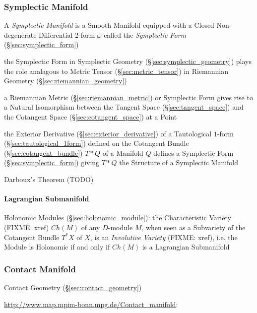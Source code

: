 \subsubsection{Symplectic Manifold}\label{sec:symplectic_manifold}

A \emph{Symplectic Manifold} is a Smooth Manifold equipped with a Closed
Non-degenerate Differential 2-form $\omega$ called the \emph{Symplectic Form}
(\S\ref{sec:symplectic_form})

the Symplectic Form in Symplectic Geometry (\S\ref{sec:symplectic_geometry})
plays the role analagous to Metric Tensor (\S\ref{sec:metric_tensor}) in
Riemannian Geometry (\S\ref{sec:riemannian_geometry})

a Riemannian Metric (\S\ref{sec:riemannian_metric}) or Symplectic Form gives
rise to a Natural Isomorphism between the Tangent Space
(\S\ref{sec:tangent_space}) and the Cotangent Space
(\S\ref{sec:cotangent_space}) at a Point

the Exterior Derivative (\S\ref{sec:exterior_derivative}) of a Tautological
$1$-form (\S\ref{sec:tautological_1form}) defined on the Cotangent Bundle
(\S\ref{sec:cotangent_bundle}) $T *
Q$ of a Manifold $Q$ defines a Symplectic Form (\S\ref{sec:symplectic_form})
giving $T * Q$ the Structure of a Symplectic Manifold

Darboux's Theorem (TODO)



\paragraph{Lagrangian Submanifold}\label{sec:lagrangian_submanifold}\hfill

\fist Holonomic Modules (\S\ref{sec:holonomic_module}): the Characteristic
Variety (FIXME: xref) $Ch(M)$ of any $D$-module $M$, when seen as a Subvariety
of the Cotangent Bundle $T^*X$ of $X$, is an \emph{Involutive Variety} (FIXME:
xref), i.e. the Module is Holonomic if and only if $Ch(M)$ is a Lagrangian
Submanifold



\subsubsection{Contact Manifold}\label{sec:contact_manifold}

\fist Contact Geometry (\S\ref{sec:contact_geometry})

\url{http://www.map.mpim-bonn.mpg.de/Contact_manifold}:

